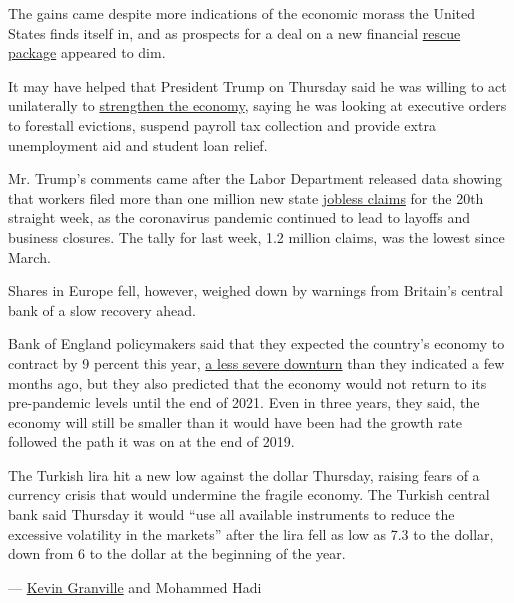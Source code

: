 The gains came despite more indications of the economic morass the
United States finds itself in, and as prospects for a deal on a new
financial
\href{https://www.nytimes3xbfgragh.onion/2020/08/05/us/politics/congress-coronavirus-stimulus.html}{rescue
package} appeared to dim.

It may have helped that President Trump on Thursday said he was willing
to act unilaterally to
\href{https://www.nytimes3xbfgragh.onion/2020/08/06/world/coronavirus-covid-19.html\#link-d79b4fa}{strengthen
the economy}, saying he was looking at executive orders to forestall
evictions, suspend payroll tax collection and provide extra unemployment
aid and student loan relief.

Mr. Trump's comments came after the Labor Department released data
showing that workers filed more than one million new state
\href{https://www.nytimes3xbfgragh.onion/live/2020/08/06/business/stock-market-today-coronavirus\#new-jobless-claims-are-set-to-exceed-one-million-for-the-20th-week}{jobless
claims} for the 20th straight week, as the coronavirus pandemic
continued to lead to layoffs and business closures. The tally for last
week, 1.2 million claims, was the lowest since March.

Shares in Europe fell, however, weighed down by warnings from Britain's
central bank of a slow recovery ahead.

Bank of England policymakers said that they expected the country's
economy to contract by 9 percent this year,
\href{https://www.nytimes3xbfgragh.onion/live/2020/08/06/business/stock-market-today-coronavirus/britains-economy-wont-fully-recover-till-end-of-2021-its-central-bankers-said}{a
less severe downturn} than they indicated a few months ago, but they
also predicted that the economy would not return to its pre-pandemic
levels until the end of 2021. Even in three years, they said, the
economy will still be smaller than it would have been had the growth
rate followed the path it was on at the end of 2019.

The Turkish lira hit a new low against the dollar Thursday, raising
fears of a currency crisis that would undermine the fragile economy. The
Turkish central bank said Thursday it would ``use all available
instruments to reduce the excessive volatility in the markets'' after
the lira fell as low as 7.3 to the dollar, down from 6 to the dollar at
the beginning of the year.

--- \href{https://www.nytimes3xbfgragh.onion/by/kevin-granville}{Kevin
Granville} and Mohammed Hadi


